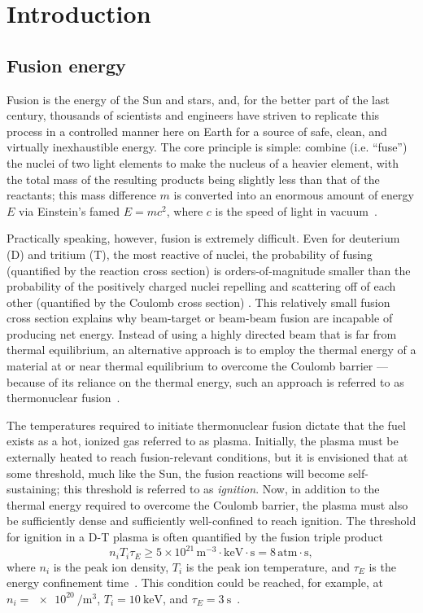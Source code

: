 \chapter{Introduction}
\label{ch:Introduction}


\section{Fusion energy}
Fusion is the energy of the Sun and stars, and,
for the better part of the last century,
thousands of scientists and engineers have striven
to replicate this process in a controlled manner here on Earth
for a source of safe, clean, and virtually inexhaustible energy.
The core principle is simple:
combine (i.e. ``fuse'') the nuclei of two light elements
to make the nucleus of a heavier element,
with the total mass of the resulting products
being slightly less than that of the reactants;
this mass difference $m$
is converted into an enormous amount of energy $E$
via Einstein's famed $E = m c^2$, where
$c$ is the speed of light in vacuum~\cite[Ch.~14]{krane}.

Practically speaking, however, fusion is extremely difficult.
Even for deuterium (D) and tritium (T), the most reactive of nuclei,
the probability of fusing
(quantified by the reaction cross section)
is orders-of-magnitude smaller than
the probability of the positively charged nuclei
repelling and scattering off of each other
(quantified by the Coulomb cross section)
\cite[Sec.~9.3.4]{freidberg_fusion_energy}.
This relatively small fusion cross section explains why
beam-target or beam-beam fusion are incapable of producing net energy.
Instead of using a highly directed beam that is far from thermal equilibrium,
an alternative approach is to employ the thermal energy
of a material at or near thermal equilibrium
to overcome the Coulomb barrier ---
because of its reliance on the thermal energy,
such an approach is referred to as thermonuclear fusion~\cite[Ch.~14]{krane}.

The temperatures required to initiate thermonuclear fusion
dictate that the fuel exists as a hot, ionized gas
referred to as plasma.
Initially, the plasma must be externally heated
to reach fusion-relevant conditions, but
it is envisioned that at some threshold, much like the Sun,
the fusion reactions will become self-sustaining;
this threshold is referred to as \emph{ignition}.
Now, in addition to the thermal energy
required to overcome the Coulomb barrier,
the plasma must also be sufficiently dense and
sufficiently well-confined
to reach ignition.
The threshold for ignition in a D-T plasma is often quantified
by the fusion triple product
\begin{equation}
  n_{i} T_{i} \tau_E
  \geq
  5 \times 10^{21} \, \text{m}^{-3} \cdot \text{keV} \cdot \text{s}
  =
  8 \, \text{atm} \cdot \text{s},
  \label{eq:Introduction:fusion_triple_product}
\end{equation}
where
$n_{i}$ is the peak ion density,
$T_{i}$ is the peak ion temperature, and
$\tau_E$ is the energy confinement time~\cite[Sec.~1.1]{wesson}.
This condition could be reached, for example, at
$n_i = \SI{e20}{\per\meter\cubed}$,
$T_i = \SI{10}{\kilo\eV}$, and
$\tau_E = \SI{3}{\second}$~\cite[Sec.~1.3]{wesson}.

